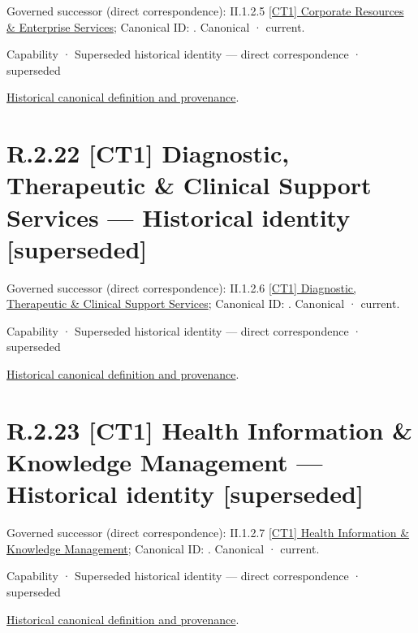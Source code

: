 {\small Governed successor (direct correspondence): II.1.2.5 \hyperref[element:b79628f156e14a8cbb82a0dea2fc57ff]{[CT1] Corporate Resources \& Enterprise Services}; Canonical ID: \texttt{}. Canonical · current.}\par
\label{element:a2dbd74847a44f4c879983229f5c9d08}
{\small Capability · Superseded historical identity — direct correspondence · superseded}\par
\href{../../../../continuum/strategy/capability/a2dbd74847a44f4c879983229f5c9d08.md}{Historical canonical definition and provenance}.\par
\section*{R.2.22 [CT1] Diagnostic, Therapeutic \& Clinical Support Services — Historical identity [superseded]}
\label{navigation:R.2.22}

{\small Governed successor (direct correspondence): II.1.2.6 \hyperref[element:4d98c3503a9f4890a677f09b0c3b6f82]{[CT1] Diagnostic, Therapeutic \& Clinical Support Services}; Canonical ID: \texttt{}. Canonical · current.}\par
\label{element:e003b9cd0730459a84775d2837d1d173}
{\small Capability · Superseded historical identity — direct correspondence · superseded}\par
\href{../../../../continuum/strategy/capability/e003b9cd0730459a84775d2837d1d173.md}{Historical canonical definition and provenance}.\par
\section*{R.2.23 [CT1] Health Information \& Knowledge Management — Historical identity [superseded]}
\label{navigation:R.2.23}

{\small Governed successor (direct correspondence): II.1.2.7 \hyperref[element:cca5d5abec204b339eb5b9bd924ed64e]{[CT1] Health Information \& Knowledge Management}; Canonical ID: \texttt{}. Canonical · current.}\par
\label{element:a1c557bd263047d0b3ff566cf50b98c1}
{\small Capability · Superseded historical identity — direct correspondence · superseded}\par
\href{../../../../continuum/strategy/capability/a1c557bd263047d0b3ff566cf50b98c1.md}{Historical canonical definition and provenance}.\par
